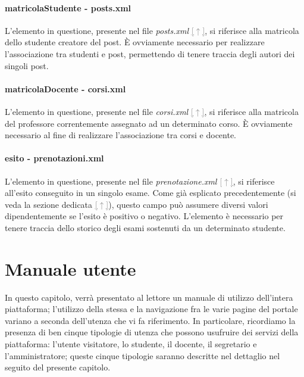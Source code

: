 \documentclass [a4paper,11pt]{book}
\begin{document}
\medskip

\subsubsection{matricolaStudente - posts.xml}

L'elemento in questione, presente nel file \emph{posts.xml} \hyperref[sec:posts]{\textcolor{gray}{[$\uparrow$]}}, si riferisce alla matricola dello studente creatore del post. È ovviamente necessario per realizzare l'associazione tra studenti e post, permettendo di tenere traccia degli autori dei singoli post.

\medskip

\subsubsection{matricolaDocente - corsi.xml}

L'elemento in questione, presente nel file \emph{corsi.xml} \hyperref[sec:corsi]{\textcolor{gray}{[$\uparrow$]}}, si riferisce alla matricola del professore correntemente assegnato ad un determinato corso. È ovviamente necessario al fine di realizzare l'associazione tra corsi e docente.

\medskip

\subsubsection{esito - prenotazioni.xml}

L'elemento in questione, presente nel file \emph{prenotazione.xml} \hyperref[sec:prenotazioni]{\textcolor{gray}{[$\uparrow$]}}, si riferisce all'esito conseguito in un singolo esame. Come già esplicato precedentemente (si veda la sezione dedicata \hyperref[sec:esito]{\textcolor{gray}{[$\uparrow$]}}), questo campo può assumere diversi valori dipendentemente se l'esito è positivo o negativo. L'elemento è necessario per tenere traccia dello storico degli esami sostenuti da un determinato studente.

\medskip

\chapter{Manuale utente}

In questo capitolo, verrà presentato al lettore un manuale di utilizzo dell'intera piattaforma; l'utilizzo della stessa e la navigazione fra le varie pagine del portale variano a seconda dell'utenza che vi fa riferimento. In particolare, ricordiamo la presenza di ben cinque tipologie di utenza che possono usufruire dei servizi della piattaforma: l'utente visitatore, lo studente, il docente, il segretario e l'amministratore; queste cinque tipologie saranno descritte nel dettaglio nel seguito del presente capitolo.
\end{document}
